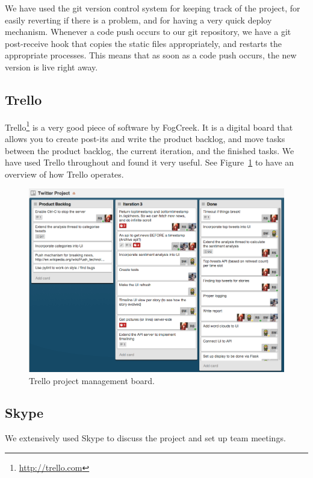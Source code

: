\documentclass{report}
\begin{document}
			We have used the git version control system for keeping track of the project, for easily reverting if there is a problem, and for having a very quick deploy mechanism. Whenever a code push occurs to our git repository, we have a git post-receive hook that copies the static files appropriately, and restarts the appropriate processes. This means that as soon as a code push occurs, the new version is live right away.
		
			\subsection{Trello}
		
			Trello\footnote{\url{http://trello.com}} is a very good piece of software by FogCreek. It is a digital board that allows you to create post-its and write the product backlog, and move tasks between the product backlog, the current iteration, and the finished tasks. We have used Trello throughout and found it very useful. See Figure~\ref{fig:trello} to have an overview of how Trello operates.
			
			\begin{figure}
			 \includegraphics[scale=0.4]{trello.png}
			 \caption{\label{fig:trello} Trello project management board.}
			\end{figure}
		
			\subsection{Skype}
		
			We extensively used Skype to discuss the project and set up team meetings.
	
\end{document}
